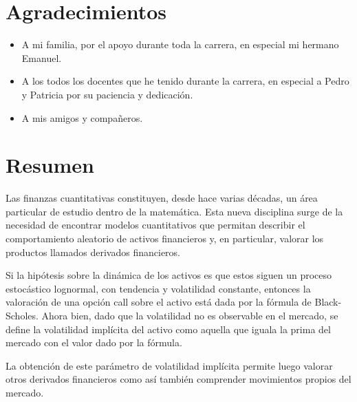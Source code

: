 \documentclass[a4paper, 12pt]{book}
\begin{document}
\chapter*{Agradecimientos} %

\begin{itemize}
\item A mi familia, por el apoyo durante toda la carrera, en especial mi hermano Emanuel.

\item A los todos los docentes que he tenido durante la carrera, en especial a Pedro y Patricia por su paciencia y dedicación.

\item A mis amigos y compañeros.

\end{itemize}

\chapter*{\hspace{0.65cm}Resumen} %

Las finanzas cuantitativas constituyen, desde hace varias décadas, un área particular de estudio dentro de la matemática. Esta nueva disciplina surge de la necesidad de encontrar modelos cuantitativos que permitan describir el comportamiento aleatorio de activos financieros y, en particular, valorar los productos llamados derivados financieros.

Si la hipótesis sobre la dinámica de los activos es que estos siguen un proceso estocástico lognormal, con tendencia y volatilidad constante, entonces la valoración de una opción call sobre el activo está dada por la fórmula de Black-Scholes. Ahora bien, dado que la volatilidad no es observable en el mercado, se define la volatilidad implícita del activo como aquella que iguala la prima del mercado con el valor dado por la fórmula.

La obtención de este parámetro de volatilidad implícita permite luego valorar otros derivados financieros como así también comprender movimientos propios del mercado.

\vspace{5mm}
\end{document}
